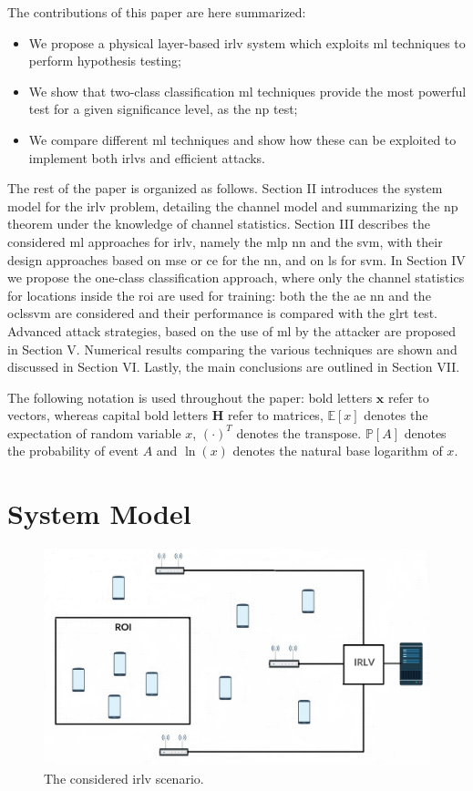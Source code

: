 \documentclass[draftcls,onecolumn,12pt]{IEEEtran}
\begin{document}
The contributions of this paper are here summarized:
\begin{itemize}
    \item We propose a  physical layer-based \ac{irlv} system which exploits \ac{ml} techniques to perform hypothesis testing;
    \item We show that two-class classification \ac{ml} techniques provide the most powerful test for a given significance level, as the \ac{np} test;
    \item We compare different \ac{ml} techniques and show how these can be exploited to implement both \acp{irlv} and efficient attacks.
\end{itemize}

The rest of the paper is organized as follows. Section II introduces the system model for the \ac{irlv} problem, detailing the channel model and summarizing the \ac{np} theorem under the knowledge of channel statistics. Section III describes the considered \ac{ml} approaches for \ac{irlv}, namely the \ac{mlp} \ac{nn} and the \ac{svm}, with their design approaches based on \ac{mse} or \ac{ce} for the \ac{nn}, and on  \ac{ls} for \ac{svm}. In Section IV we propose the one-class classification approach, where only the channel statistics for  locations inside the \ac{roi} are used for training: both the the \ac{ae} \ac{nn} and the \ac{oclssvm} are considered and their performance is compared with the \ac{glrt} test. Advanced attack strategies, based on the use of \ac{ml} by the attacker are proposed in Section V. Numerical results comparing the various techniques are shown and discussed in Section VI. Lastly, the main conclusions are outlined in Section VII.

The following notation is used throughout the paper: bold letters $\bm{x}$ refer to vectors, whereas capital bold letters $\bm{H}$ refer to matrices, $\mathbb{E}[x]$ denotes the expectation of random variable $x$, $(\cdot)^T$ denotes the transpose. $\mathbb P[A]$ denotes the probability of event $A$ and  $\ln(x)$ denotes the natural base logarithm of $x$.

\section{System Model}

\begin{figure}
    \centering
    \includegraphics[width=0.6\columnwidth]{irlv.JPG}
    \caption{The considered \ac{irlv} scenario.}
    \label{fig1}
\end{figure}
\end{document}
